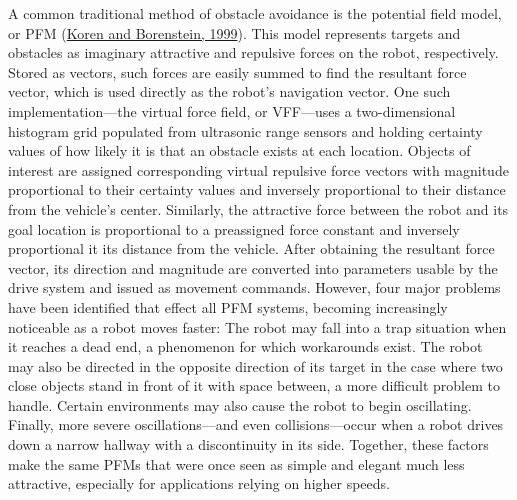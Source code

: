\documentclass[12pt]{report}
\begin{document}
A common traditional method of obstacle avoidance is the potential field model, or PFM (\hyperref[bib:koren]{Koren and Borenstein, 1999}).  This model represents targets and obstacles as imaginary attractive and repulsive forces on the robot, respectively.  Stored as vectors, such forces are easily summed to find the resultant force vector, which is used directly as the robot's navigation vector.  One such implementation---the virtual force field, or VFF---uses a two-dimensional histogram grid populated from ultrasonic range sensors and holding certainty values of how likely it is that an obstacle exists at each location.  Objects of interest are assigned corresponding virtual repulsive force vectors with magnitude proportional to their certainty values and inversely proportional to their distance from the vehicle's center.  Similarly, the attractive force between the robot and its goal location is proportional to a preassigned force constant and inversely proportional it its distance from the vehicle.  After obtaining the resultant force vector, its direction and magnitude are converted into parameters usable by the drive system and issued as movement commands.  However, four major problems have been identified that effect all PFM systems, becoming increasingly noticeable as a robot moves faster:  The robot may fall into a trap situation when it reaches a dead end, a phenomenon for which workarounds exist.  The robot may also be directed in the opposite direction of its target in the case where two close objects stand in front of it with space between, a more difficult problem to handle.  Certain environments may also cause the robot to begin oscillating.  Finally, more severe oscillations---and even collisions---occur when a robot drives down a narrow hallway with a discontinuity in its side.  Together, these factors make the same PFMs that were once seen as simple and elegant much less attractive, especially for applications relying on higher speeds.
\end{document}
